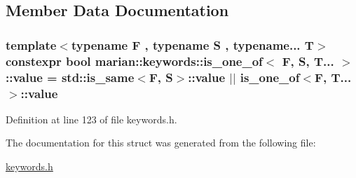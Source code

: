 \subsection{Member Data Documentation}
\subsubsection[{\texorpdfstring{value}{value}}]{\setlength{\rightskip}{0pt plus 5cm}template$<$typename F , typename S , typename... T$>$ constexpr bool {\bf marian\+::keywords\+::is\+\_\+one\+\_\+of}$<$ F, S, T... $>$\+::value = std\+::is\+\_\+same$<$F, S$>$\+::value $\vert$$\vert$ {\bf is\+\_\+one\+\_\+of}$<$F, T...$>$\+::value\hspace{0.3cm}{\ttfamily [static]}}\hypertarget{structmarian_1_1keywords_1_1is__one__of_3_01F_00_01S_00_01T_8_8_8_01_4_a3e314d3b6d9bd8be9b664bfd15478a93}{}\label{structmarian_1_1keywords_1_1is__one__of_3_01F_00_01S_00_01T_8_8_8_01_4_a3e314d3b6d9bd8be9b664bfd15478a93}


Definition at line 123 of file keywords.\+h.



The documentation for this struct was generated from the following file\+:\begin{DoxyCompactItemize}
\item 
\hyperlink{keywords_8h}{keywords.\+h}\end{DoxyCompactItemize}
